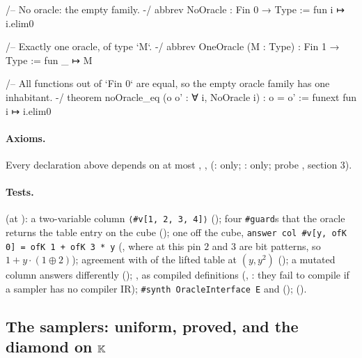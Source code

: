

\begin{leancode}
/-- No oracle: the empty family. -/
abbrev NoOracle : Fin 0 → Type := fun i ↦ i.elim0

/-- Exactly one oracle, of type `M`. -/
abbrev OneOracle (M : Type) : Fin 1 → Type := fun _ ↦ M

/-- All functions out of `Fin 0` are equal, so the empty oracle family has one inhabitant. -/
theorem noOracle_eq (o o' : ∀ i, NoOracle i) : o = o' := funext fun i ↦ i.elim0
\end{leancode}


\paragraph{Axioms.} Every declaration above depends on at most ,
,  (:  only;
:  only; probe , section 3).

\paragraph{Tests.} \allowbreak{}\allowbreak{}\allowbreak{} (at ): a
two-variable column \texttt{⟨\#v[1, 2, 3, 4]⟩} (); four \texttt{\#guard}s that the oracle
returns the table entry on the cube (); one off the cube,
\texttt{answer col \#v[y, ofK 0] = ofK 1 + ofK 3 * y} (, where at this pin $2$ and $3$ are
bit patterns, so $1 + y\cdot(1 \oplus 2)$); agreement with  of the lifted table at
$(y, y^2)$ (); a mutated column answers differently (); ,
 as compiled definitions (, : they fail to compile if a sampler
has no compiler IR); \texttt{\#synth OracleInterface E} and  ();
\allowbreak{} ().

\subsection{The samplers: uniform, proved, and the diamond on \texorpdfstring{$\mathbb{K}$}{K}}\label{sec:gen-l0-samplers}

